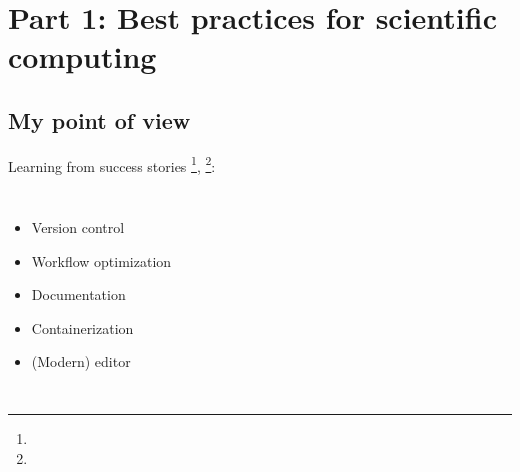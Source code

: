 \documentclass[usenames,dvipsnames]{beamer}
\theoremstyle{plain}
\theoremstyle{definition}
\begin{document}
\section{Part 1: Best practices for scientific computing}
\subsection{My point of view}

\begin{frame}{\setframetitle{}}
  Learning from success stories  \footnote{}, \footnote{}:
  
  \begin{columns}[t]
    
    \begin{itemize}
      \item Version control 
      
      \item Workflow optimization
      
      \item Documentation

      \item Containerization
      
      \item (Modern) editor
    \end{itemize}
    
  \end{columns}
  
\end{frame}



\end{document}
